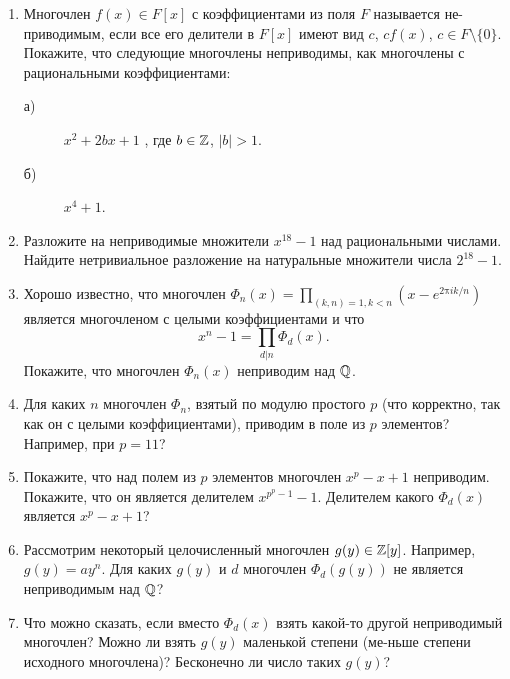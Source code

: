 \begin{enumerate}
\item Многочлен $f(x)\in F[x]$ с коэффициентами из поля $F$ называется не-\linebreak приводимым, если все его делители в $F[x]$ имеют вид $c$, $cf(x)$, $c\in F\setminus\{0\}$. 
Покажите, что следующие многочлены неприводимы, как многочлены с рациональными коэффициентами:
\begin{description}
\item[а)] $x^2+2bx +1$ , где $b\in\mathbb{Z}$, $|b|>1$.
\item[б)] $x^4+1$.
\end{description}
\item Разложите на неприводимые множители $x^{18}-1$ над рациональными числами. Найдите нетривиальное разложение на натуральные множители числа $2^{18}-1$.
\item Хорошо известно, что многочлен $\Phi_n(x)=\prod_{(k,n)=1, k<n} (x-e^{2\text{π} i k/n})$ является многочленом с целыми коэффициентами и что
	$$x^n-1=\prod_{d|n}\Phi_d(x).$$
Покажите, что многочлен $\Phi_n(x)$ неприводим над $\mathbb{Q}$.
\item Для каких $n$ многочлен $\Phi_n$, взятый по модулю простого $p$ (что корректно, так как он с целыми коэффициентами), приводим в поле из $p$ элементов? Например, при $p=11$?
\item Покажите, что над полем из $p$ элементов многочлен $x^p-x+1$ неприводим. Покажите, что он является делителем $x^{p^p-1}-1$. Делителем какого $\Phi_d(x)$ является $x^p-x+1$?
\item Рассмотрим некоторый целочисленный многочлен $g(y)\in\mathbb{Z}[y]$. Например, $g(y)=ay^n$. Для каких $g(y)$ и $d$ многочлен $\Phi_d(g(y))$ не является неприводимым над $\mathbb{Q}$?
\item Что можно сказать, если вместо $\Phi_d(x)$ взять какой-то другой неприводимый многочлен? Можно ли взять $g(y)$ маленькой степени (ме-\linebreak ньше степени исходного многочлена)? Бесконечно ли число таких $g(y)$?
\end{enumerate}

